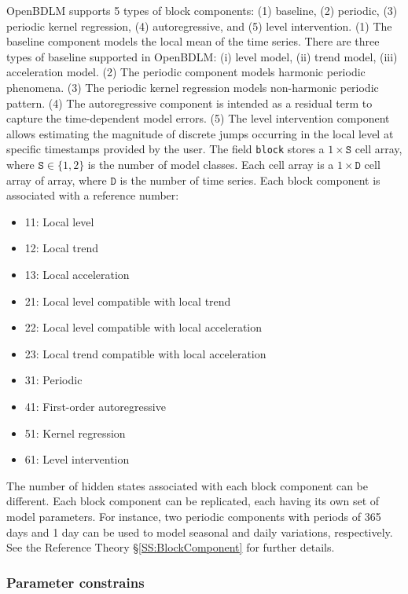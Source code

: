 OpenBDLM supports 5 types of block components: (1) baseline, (2) periodic, (3) periodic kernel regression, (4) autoregressive, and (5) level intervention. 
(1) The baseline component models the local mean of the time series. 
There are three types of baseline supported in OpenBDLM: (i) level model, (ii) trend model, (iii) acceleration model. 
(2) The periodic component models harmonic periodic phenomena. %
(3) The periodic kernel regression models non-harmonic periodic pattern.
(4) The autoregressive component is intended as a residual term to capture the time-dependent model errors.
(5) The level intervention component allows estimating the magnitude of discrete jumps occurring in the local level at specific timestamps provided by the user.
The field \lstinline[basicstyle = \mlttfamily \small ]!block! stores a $1\times \mathtt{S}$ cell array, where $\mathtt{S} \in \{1,2 \}$ is the number of model classes.
Each cell array is a $1\times \mathtt{D}$ cell array of array, where $\mathtt{D}$ is the number of time series.
Each block component is associated with a reference number:
\begin{itemize}\setlength\itemsep{0em}
\item 11: Local level 
\item 12: Local trend
\item 13: Local acceleration
\item 21: Local level compatible with local trend
\item 22: Local level compatible with local acceleration
\item 23: Local trend compatible with local acceleration
\item 31: Periodic
\item 41: First-order autoregressive
\item 51: Kernel regression
\item 61: Level intervention
\end{itemize}
The number of hidden states associated with each block component can be different. 
Each block component can be replicated, each having its own set of model parameters. 
For instance, two periodic components with periods of 365 days and 1 day can be used to model seasonal and daily variations, respectively. See the Reference Theory \S\ref{SS:BlockComponent} for further details.

\subsubsection{Parameter constrains}

